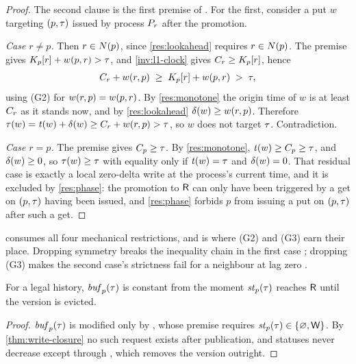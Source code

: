 \begin{proof}
The second clause is the first premise of . For the first,
consider a put $w$ targeting $(p,\tau)$ issued by process $P_{r}$ after the
promotion.

\emph{Case $r \ne p$.} Then $r \in N(p)$, since \cref{res:lookahead}
requires $r \in N(p)$. The  premise gives
$K_{p}[r] + w(p,r) > \tau$, and \cref{inv:l1-clock} gives
$C_{r} \ge K_{p}[r]$, hence
\[
  C_{r} + w(r,p) \;\ge\; K_{p}[r] + w(p,r) \;>\; \tau,
\]
using (G2) for $w(r,p) = w(p,r)$. By \cref{res:monotone} the origin
time of $w$ is at least $C_{r}$ as it stands now, and by
\cref{res:lookahead} $\delta(w) \ge w(r,p)$. Therefore
$\tau(w) = \mathit{t}(w) + \delta(w) \ge C_{r} + w(r,p) > \tau$, so
$w$ does not target $\tau$. Contradiction.

\emph{Case $r = p$.} The  premise gives $C_{p} \ge \tau$. By
\cref{res:monotone}, $\mathit{t}(w) \ge C_{p} \ge \tau$, and
$\delta(w) \ge 0$, so $\tau(w) \ge \tau$ with equality only if
$\mathit{t}(w) = \tau$ and $\delta(w) = 0$. That residual case is exactly a
local zero-\gls{delta} write at the process's current time, and it is excluded by
\cref{res:phase}: the promotion to $\mathsf{R}$ can only have been triggered by a get
on $(p,\tau)$ having been issued, and \cref{res:phase} forbids $p$ from
issuing a put on $(p,\tau)$ after such a get.
\end{proof}

 consumes all four mechanical restrictions, and is
where (G2) and (G3) earn their place. Dropping symmetry breaks the inequality
chain in the first case ; dropping (G3) makes the
second case's strictness fail for a neighbour at lag zero
.

\begin{corollary}[Immutability]\label{thm:immutability}
For a legal history, $\mathit{buf}_{p}(\tau)$ is constant from the moment
$\mathit{st}_{p}(\tau)$ reaches $\mathsf{R}$ until the version is evicted.
\end{corollary}

\begin{proof}
$\mathit{buf}_{p}(\tau)$ is modified only by , whose premise requires
$\mathit{st}_{p}(\tau) \in \{\varnothing, \mathsf{W}\}$. By \cref{thm:write-closure} no such
request exists after publication, and statuses never decrease except through
, which removes the version outright.
\end{proof}

